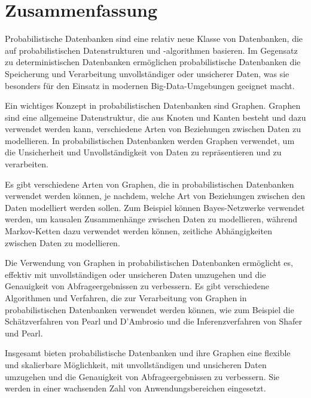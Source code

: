 \chapter{Zusammenfassung}

Probabilistische Datenbanken sind eine relativ neue Klasse von Datenbanken, die auf probabilistischen Datenstrukturen und -algorithmen basieren. Im Gegensatz zu deterministischen Datenbanken ermöglichen probabilistische Datenbanken die Speicherung und Verarbeitung unvollständiger oder unsicherer Daten, was sie besonders für den Einsatz in modernen Big-Data-Umgebungen geeignet macht.

Ein wichtiges Konzept in probabilistischen Datenbanken sind Graphen. Graphen sind eine allgemeine Datenstruktur, die aus Knoten und Kanten besteht und dazu verwendet werden kann, verschiedene Arten von Beziehungen zwischen Daten zu modellieren. In probabilistischen Datenbanken werden Graphen verwendet, um die Unsicherheit und Unvollständigkeit von Daten zu repräsentieren und zu verarbeiten.

Es gibt verschiedene Arten von Graphen, die in probabilistischen Datenbanken verwendet werden können, je nachdem, welche Art von Beziehungen zwischen den Daten modelliert werden sollen. Zum Beispiel können Bayes-Netzwerke verwendet werden, um kausalen Zusammenhänge zwischen Daten zu modellieren, während Markov-Ketten dazu verwendet werden können, zeitliche Abhängigkeiten zwischen Daten zu modellieren.

Die Verwendung von Graphen in probabilistischen Datenbanken ermöglicht es, effektiv mit unvollständigen oder unsicheren Daten umzugehen und die Genauigkeit von Abfrageergebnissen zu verbessern. Es gibt verschiedene Algorithmen und Verfahren, die zur Verarbeitung von Graphen in probabilistischen Datenbanken verwendet werden können, wie zum Beispiel die Schätzverfahren von Pearl und D'Ambrosio und die Inferenzverfahren von Shafer und Pearl.

Insgesamt bieten probabilistische Datenbanken und ihre Graphen eine flexible und skalierbare Möglichkeit, mit unvollständigen und unsicheren Daten umzugehen und die Genauigkeit von Abfrageergebnissen zu verbessern. Sie werden in einer wachsenden Zahl von Anwendungsbereichen eingesetzt.


\cleardoublepage